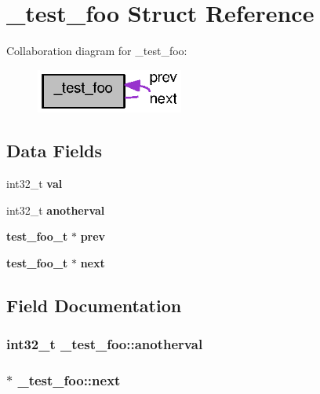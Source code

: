 \section{\_\-test\_\-foo Struct Reference}
\label{struct__test__foo}


Collaboration diagram for \_\-test\_\-foo:\nopagebreak
\begin{figure}[H]
\begin{center}
\leavevmode
\includegraphics[width=137pt]{struct__test__foo__coll__graph}
\end{center}
\end{figure}
\subsection*{Data Fields}
\begin{DoxyCompactItemize}
\item 
int32\_\-t {\bf val}
\item 
int32\_\-t {\bf anotherval}
\item 
{\bf test\_\-foo\_\-t} $\ast$ {\bf prev}
\item 
{\bf test\_\-foo\_\-t} $\ast$ {\bf next}
\end{DoxyCompactItemize}


\subsection{Field Documentation}
\subsubsection[{anotherval}]{\setlength{\rightskip}{0pt plus 5cm}int32\_\-t {\bf \_\-test\_\-foo::anotherval}}\label{struct__test__foo_a64a1c8543436c49859f5448e165ebd80}
\subsubsection[{next}]{ $\ast$ {\bf \_\-test\_\-foo::next}}\label{struct__test__foo_ad839cc82fbd6fba79a935c7f4c31d06e}
